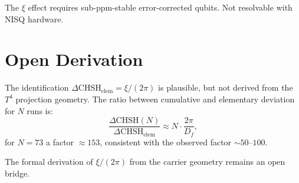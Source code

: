 The $\xi$ effect requires sub-ppm-stable error-corrected qubits.
Not resolvable with NISQ hardware.

\section{Open Derivation}

The identification $\Delta\mathrm{CHSH}_{\mathrm{elem}} = \xi/(2\pi)$
is plausible, but not derived from the $T^4$ projection geometry.
The ratio between cumulative and elementary deviation for
$N$ runs is:
\begin{equation}
  \frac{\Delta\mathrm{CHSH}(N)}{\Delta\mathrm{CHSH}_{\mathrm{elem}}}
  \approx N\cdot\frac{2\pi}{D_f},
\end{equation}
for $N=73$ a factor $\approx153$, consistent with the observed
factor $\sim50$--$100$.

The formal derivation of $\xi/(2\pi)$ from the carrier geometry
remains an open bridge.

